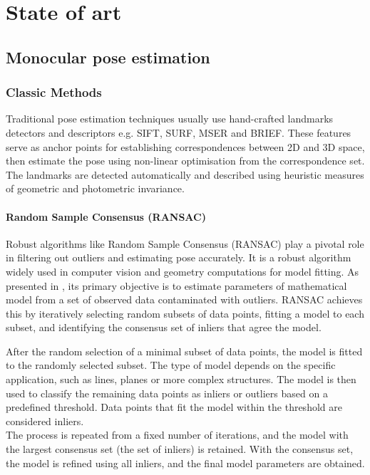 
\chapter{State of art} %

\label{Chapter3}

\section{Monocular pose estimation}

\subsection{Classic Methods}
Traditional pose estimation techniques usually use hand-crafted landmarks detectors and descriptors e.g. SIFT, SURF, MSER and BRIEF. These features serve as anchor points for establishing correspondences between 2D and 3D space, then estimate the pose using non-linear optimisation from the correspondence set. The landmarks are detected automatically and described using heuristic measures of geometric and photometric invariance.

\subsubsection{Random Sample Consensus (RANSAC)}
Robust algorithms like Random Sample Consensus (RANSAC) \cite{RANSAC} play a pivotal role in filtering out outliers and estimating pose accurately. It is a robust algorithm widely used in computer vision and geometry computations for model fitting. As presented in \cite{Lowe2004DistinctiveIF}, its primary objective is to estimate parameters of mathematical model from a set of observed data contaminated with outliers. RANSAC achieves this by iteratively selecting random subsets of data points, fitting a model to each subset, and identifying the consensus set of inliers that agree the model.

After the random selection of a minimal subset of data points, the model is fitted to the randomly selected subset. The type of model depends on the specific application, such as lines, planes or more complex structures. The model is then used to classify the remaining data points as inliers or outliers based on a predefined threshold. Data points that fit the model within the threshold are considered inliers.\\
The process is repeated from a fixed number of iterations, and the model with the largest consensus set (the set of inliers) is retained. With the consensus set, the model is refined using all inliers, and the final model parameters are obtained.

